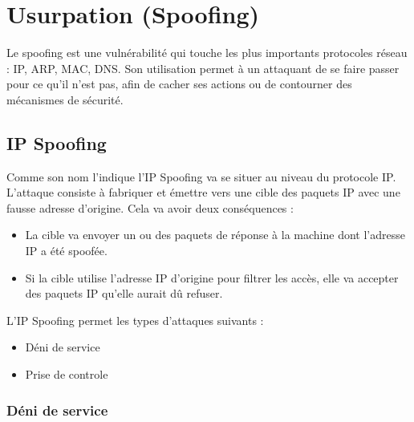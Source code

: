 

\newpage
\section{Usurpation (Spoofing)}\label{vulnerabilites:reseau:spoofing}

Le spoofing est une vulnérabilité qui touche les plus importants protocoles réseau : IP, ARP, MAC, DNS.
Son utilisation permet à un attaquant de se faire passer pour ce qu'il n'est pas, %
afin de cacher ses actions ou de contourner des mécanismes de sécurité.

\subsection{IP Spoofing}\label{vulnerabilites:reseau:spoofing:ip}

Comme son nom l'indique l'IP Spoofing va se situer au niveau du protocole IP. L'attaque consiste à fabriquer et émettre vers une cible des paquets IP avec une fausse adresse d'origine. Cela va avoir deux conséquences :

\begin{itemize}
\item La cible va envoyer un ou des paquets de réponse à la machine dont l'adresse IP a été spoofée.
\item Si la cible utilise l'adresse IP d'origine pour filtrer les accès, elle va accepter des paquets IP qu'elle aurait dû refuser.
\end{itemize}

\begin{tabbing}
\end{tabbing}
L'IP Spoofing permet les types d'attaques suivants :

\begin{itemize}
\item Déni de service
\item Prise de controle
\end{itemize}

\subsubsection{Déni de service}\label{vulnerabilites:reseau:spoofing:ip:dos}

